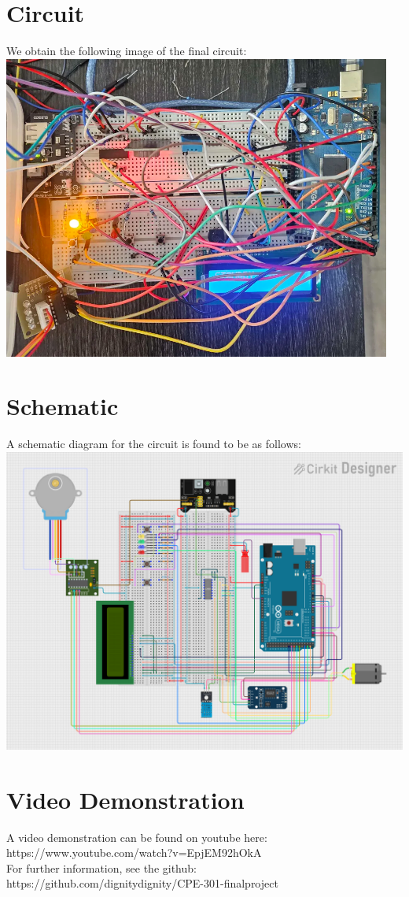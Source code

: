 \documentclass{article}
\begin{document}
\section{Circuit}
We obtain the following image of the final circuit:\\
\includegraphics[height=100mm]{circuit.png}
\section{Schematic}
A schematic diagram for the circuit is found to be as follows:\\
\includegraphics[height=100mm]{schematic.png}
\section{Video Demonstration}
A video demonstration can be found on youtube here:\\
https://www.youtube.com/watch?v=EpjEM92hOkA\\
For further information, see the github:\\
https://github.com/dignitydignity/CPE-301-finalproject
\end{document}
